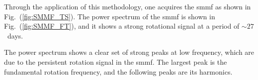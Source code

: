 Through the application of this methodology, one acquires the \gls{smmf} as shown in Fig.~(\ref{fig:SMMF_TS}). The power spectrum of the \gls{smmf} is shown in Fig.~(\ref{fig:SMMF_FT}), and it shows a strong rotational signal at a period of $\sim27$~days. 



The power spectrum shows a clear set of strong peaks at low frequency, which are due to the persistent rotation signal in the \gls{smmf}. The largest peak is the fundamental rotation frequency, and the following peaks are its harmonics.


